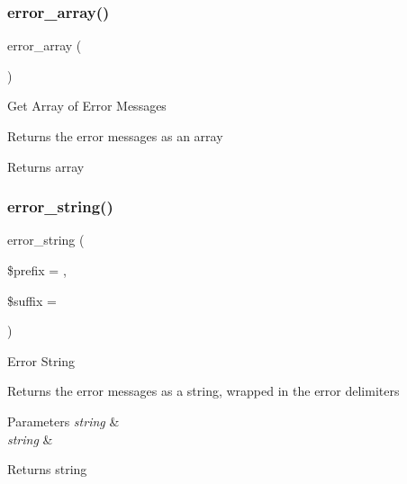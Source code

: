 \subsubsection{\texorpdfstring{error\+\_\+array()}{error\_array()}}
{\footnotesize\ttfamily error\+\_\+array (\begin{DoxyParamCaption}{ }\end{DoxyParamCaption})}

Get Array of Error Messages

Returns the error messages as an array

\begin{DoxyReturn}{Returns}
array 
\end{DoxyReturn}
\mbox{\label{class_c_i___form__validation_a63271bfb23c2963bed80f44fe9c27b09}} 
\subsubsection{\texorpdfstring{error\+\_\+string()}{error\_string()}}
{\footnotesize\ttfamily error\+\_\+string (\begin{DoxyParamCaption}\item[{}]{\$prefix = {\ttfamily \textquotesingle{}\textquotesingle{}},  }\item[{}]{\$suffix = {\ttfamily \textquotesingle{}\textquotesingle{}} }\end{DoxyParamCaption})}

Error String

Returns the error messages as a string, wrapped in the error delimiters


\begin{DoxyParams}{Parameters}
{\em string} & \\
\hline
{\em string} & \\
\hline
\end{DoxyParams}
\begin{DoxyReturn}{Returns}
string 
\end{DoxyReturn}
\mbox{\label{class_c_i___form__validation_a126edde2bb0ce82d7a202e340a61de9e}} 
